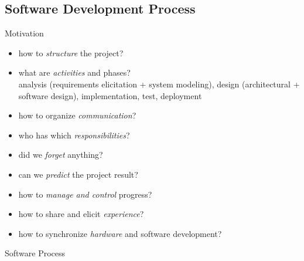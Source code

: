 \subsection{Software Development Process}
\begin{frame}{\insertsubsection}
	\begin{fancycolumns}
		\begin{note}{Motivation}
			\begin{itemize}
				\item how to \emph{structure} the project?
				\item what are \emph{activities} and phases?\\analysis (requirements elicitation + system modeling), design (architectural + software design), implementation, test, deployment
				\item how to organize \emph{communication}?
				\item who has which \emph{responsibilities}?
				\item did we \emph{forget} anything?
				\item can we \emph{predict} the project result?
				\item how to \emph{manage and control} progress?
				\item how to share and elicit \emph{experience}?
				\item how to synchronize \emph{hardware} and software development?
			\end{itemize}
		\end{note}
		\nextcolumn
		\begin{definition}{Software Process \mysource{\sommerville}}
		\end{definition}
	\end{fancycolumns}
\end{frame}

